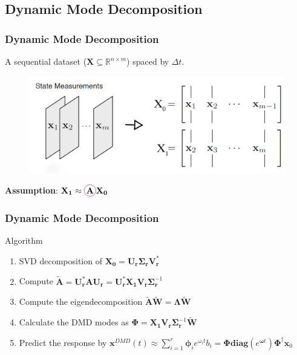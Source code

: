\documentclass[fleqn]{beamer}
\renewcommand{\vec}[1]{\bm{#1}} %
\begin{document}
\subsection{Dynamic Mode Decomposition}
\begin{frame}
\frametitle {Dynamic Mode Decomposition}
A sequential dataset ($\mathbf{X} \subseteq \mathbb{R}^{n\times m}$) spaced by $\Delta t$.\footnotemark
\begin{figure}[!htb]
\centering
\includegraphics[scale=0.17]{figures/snapshot.jpg}
\label{fig:data_matrix}
\end{figure} 
\begin{block}{}
\small{\textbf{Assumption}}: 
$
\mathbf{X_1} \approx  \tikz[baseline]{\node[draw=purple,anchor=base,
circle,inner xsep=-2pt,inner ysep=3pt] {$\mathbf{A}$}} \mathbf{X_0}
$
\end{block}
\end{frame}

\begin{frame}
\frametitle{Dynamic Mode Decomposition}
\begin{block}{Algorithm}
\begin{enumerate}
\item SVD decomposition of $ \mathbf{X_0} = \mathbf{U_r} \boldsymbol{\Sigma_r} \mathbf{V_r^{*}}$
\pause
\item Compute $\mathbf{\tilde{A}}=\mathbf{U_r^{*}AU_r}=\mathbf{U_r^{*}X_1}\mathbf{V_r}\boldsymbol{\Sigma}_{\mathbf{r}}^{-1}$
\pause
\item Compute the eigendecomposition $\mathbf{\tilde{A} \tilde{W}}=\boldsymbol{\Lambda}\mathbf{\tilde{W}}$
\pause
\item Calculate the DMD modes as ${\boldsymbol{\Phi}}={\mathbf{X_1V_r}}\boldsymbol{\Sigma}_\mathbf{r}^{-1}{\mathbf{\tilde{W}}}$
\pause
\item Predict the response by $\vec{x}^{DMD}(t) \approx \sum_{i=1}^{r} \vec{\phi}_i e^{\omega_it} b_i = \boldsymbol{\Phi}{\mathbf{diag}}(e^{\vec{\omega}t})\boldsymbol{\Phi}^{\dag} \mathbf{x}_{0}$
\end{enumerate}
\end{block}
\end{frame}  
\end{document}
